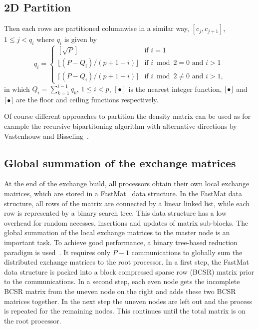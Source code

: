 \documentclass[twocolumn,showkeys,showpacs,preprintnumbers,amsmath,amssymb]{revtex4}
\begin{document}
\subsection{2D Partition}
 Then each rows are partitioned columnwise in a similar way,
 $[c_j,c_{j+1}]$, $1 \le j < q_i$ where $q_i$ is given
 by 
\begin{equation}
  q_i = \left\{ \begin{array}{ll}
    [\sqrt{P}]                    & \textrm{if $i=1$}\\
    \lfloor(P-Q_i)/(p+1-i)\rfloor & \textrm{if $i\bmod2=0$ and $i>1$}\\
    \lceil (P-Q_i)/(p+1-i)\rceil  & \textrm{if $i\bmod2\ne0$ and $i>1$,}
    \end{array} \right.
\end{equation}
 in which $Q_i=\sum_{k=1}^{i-1}q_k$, $1 \le i < p$, $[\bullet]$ 
 is the nearest integer function, $\lfloor\bullet\rfloor$ and $\lceil\bullet\rceil$
 are the floor and ceiling functions respectively.
 
 Of course different approaches to partition the density matrix can be 
 used as for example the recursive bipartitoning algorithm with
 alternative directions by Vastenhouw and Bisseling~\cite{BVastenhouw}.

\subsection{Global summation of the exchange matrices}
 At the end of the exchange build, all processors obtain their own local
 exchange matrices, which are stored in a FastMat~\cite{CGan04B} data
 structure. In the FastMat data structure, all rows of the matrix 
 are connected by a linear linked list, while each row is represented
 by a binary search tree. This data structure has a low overhead for random
 accesses, insertions and updates of matrix sub-blocks.
 The global summation of the local exchange matrices to the master node is
 an important task. To achieve good performance, a binary tree-based 
 reduction paradigm is used~\cite{GFox88,RGeijn91}. It requires 
 only $P-1$ communications to globally
 sum the distributed exchange matrices to the root processor.
 In a first step, the FastMat data structure is packed into a 
 block compressed sparse row (BCSR) matrix
 prior to the communications. In a second step,
 each even node gets the incomplete BCSR matrix from the 
 uneven node on the right and adds these two BCSR matrices together. 
 In the next step the uneven nodes are left out and the process 
 is repeated for the remaining nodes. This continues until the total 
 matrix is on the root processor. 
\end{document}

